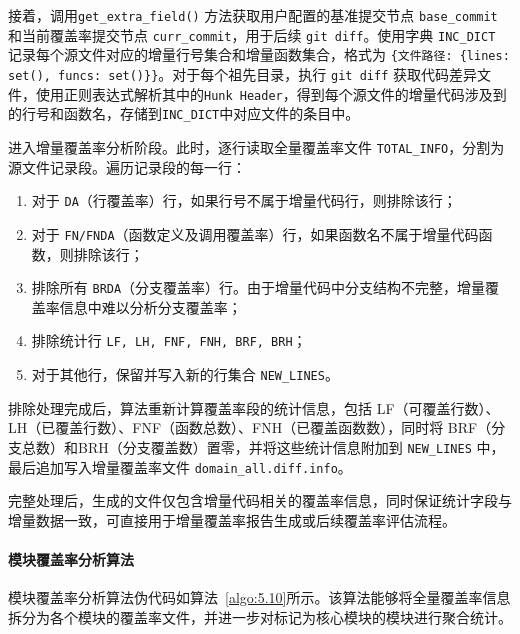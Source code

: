 接着，调用\verb|get_extra_field()| 方法获取用户配置的基准提交节点 \verb|base_commit| 和当前覆盖率提交节点 \verb|curr_commit|，用于后续 \verb|git diff|。使用字典 \verb|INC_DICT| 记录每个源文件对应的增量行号集合和增量函数集合，格式为 \verb|{文件路径: {lines: set(), funcs: set()}}|。对于每个祖先目录，执行 \verb|git diff| 获取代码差异文件，使用正则表达式解析其中的\verb|Hunk Header|，得到每个源文件的增量代码涉及到的行号和函数名，存储到\verb|INC_DICT|中对应文件的条目中。

进入增量覆盖率分析阶段。此时，逐行读取全量覆盖率文件 \verb|TOTAL_INFO|，分割为源文件记录段。遍历记录段的每一行：
\begin{enumerate}
    \item 对于 \verb|DA|（行覆盖率）行，如果行号不属于增量代码行，则排除该行；
    \item 对于 \verb|FN/FNDA|（函数定义及调用覆盖率）行，如果函数名不属于增量代码函数，则排除该行；
    \item 排除所有 \verb|BRDA|（分支覆盖率）行。由于增量代码中分支结构不完整，增量覆盖率信息中难以分析分支覆盖率；
    \item 排除统计行 \verb|LF, LH, FNF, FNH, BRF, BRH|；
    \item 对于其他行，保留并写入新的行集合 \verb|NEW_LINES|。
\end{enumerate}

排除处理完成后，算法重新计算覆盖率段的统计信息，包括 LF（可覆盖行数）、LH（已覆盖行数）、FNF（函数总数）、FNH（已覆盖函数数），同时将 BRF（分支总数）和BRH（分支覆盖数）置零，并将这些统计信息附加到 \verb|NEW_LINES| 中，最后追加写入增量覆盖率文件 \verb|domain_all.diff.info|。

完整处理后，生成的文件仅包含增量代码相关的覆盖率信息，同时保证统计字段与增量数据一致，可直接用于增量覆盖率报告生成或后续覆盖率评估流程。

\paragraph{\textbf{模块覆盖率分析算法}}
模块覆盖率分析算法伪代码如算法~\ref{algo:5.10}所示。该算法能够将全量覆盖率信息拆分为各个模块的覆盖率文件，并进一步对标记为核心模块的模块进行聚合统计。

